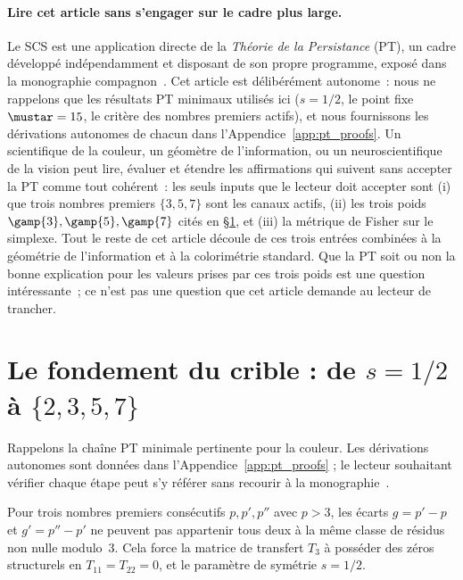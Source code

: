 \documentclass[12pt,a4paper]{article}
\begin{document}
\paragraph{Lire cet article sans s'engager sur le cadre plus large.}
Le SCS est une application directe de la \emph{Th\'eorie de la
Persistance} (PT), un cadre d\'evelopp\'e ind\'ependamment et disposant
de son propre programme, expos\'e dans la monographie
compagnon~\cite{senez2026math}. Cet article est d\'elib\'er\'ement
autonome~: nous ne rappelons que les r\'esultats PT minimaux utilis\'es
ici ($s = 1/2$, le point fixe $\mustar = 15$, le crit\`ere des
nombres premiers actifs), et nous fournissons les d\'erivations
autonomes de chacun dans l'Appendice~\ref{app:pt_proofs}. Un
scientifique de la couleur, un g\'eom\`etre de l'information, ou un
neuroscientifique de la vision peut lire, \'evaluer et \'etendre les
affirmations qui suivent sans accepter la PT comme tout coh\'erent~:
les seuls inputs que le lecteur doit accepter sont (i) que trois
nombres premiers $\{3, 5, 7\}$ sont les canaux actifs, (ii) les trois
poids $\gamp{3}, \gamp{5}, \gamp{7}$ cit\'es en
\S\ref{sec:foundation}, et (iii) la m\'etrique de Fisher sur le
simplexe. Tout le reste de cet article d\'ecoule de ces trois entr\'ees
combin\'ees \`a la g\'eom\'etrie de l'information et \`a la
colorim\'etrie standard. Que la PT soit ou non la bonne explication
pour les valeurs prises par ces trois poids est une question
int\'eressante~; ce n'est pas une question que cet article demande au
lecteur de trancher.

\section{Le fondement du crible : de $s = 1/2$ \`a $\{2, 3, 5, 7\}$}
\label{sec:foundation}

Rappelons la cha\^ine PT minimale pertinente pour la couleur.
Les d\'erivations autonomes sont donn\'ees dans
l'Appendice~\ref{app:pt_proofs} ; le lecteur souhaitant v\'erifier
chaque \'etape peut s'y r\'ef\'erer sans recourir \`a la
monographie~\cite{senez2026math}.

\begin{theorembox}
Pour trois nombres premiers cons\'ecutifs $p, p', p''$ avec $p > 3$,
les \'ecarts $g = p'-p$ et $g' = p''-p'$ ne peuvent pas appartenir
tous deux \`a la m\^eme classe de r\'esidus non nulle modulo~3. Cela
force la matrice de transfert $T_3$ \`a poss\'eder des z\'eros
structurels en $T_{11} = T_{22} = 0$, et le param\`etre de
sym\'etrie $s = 1/2$.
\end{theorembox}
\end{document}
